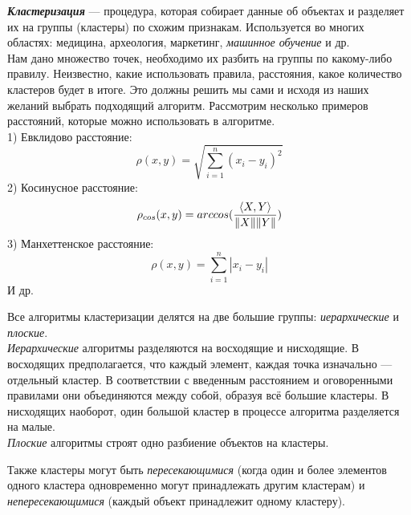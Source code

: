 \documentclass[12pt, a4paper]{article}
\begin{document}
\textit{\textbf{Кластеризация}}  —  процедура, которая собирает данные об объектах и разделяет их на группы (кластеры) по схожим признакам. Используется во многих областях: медицина, археология, маркетинг, \textit{машинное обучение} и др.\\
Нам дано множество точек, необходимо их разбить на группы по какому-либо правилу. Неизвестно, какие использовать правила, расстояния, какое количество кластеров будет в итоге. Это должны решить мы сами и исходя из наших желаний выбрать подходящий алгоритм. Рассмотрим несколько примеров расстояний, которые можно использовать в алгоритме.\\
1) Евклидово расстояние: 
\begin{equation}\label{eq:one}
\rho (x, y) = \sqrt{\sum_{i=1}^n (x_i - y_i)^2}
\end{equation}
2) Косинусное расстояние:
\begin{equation}\label{eq:two}
\rho_{cos} (x, y) = arccos({{\langle X,Y\rangle}\over{\| X \| \| Y \|}})
\end{equation}
3) Манхеттенское расстояние:
\begin{equation}\label{eq:three}
\rho (x, y) = \sum_{i=1}^n |x_i - y_i|
\end{equation}
И др.

Все алгоритмы кластеризации делятся на две большие группы: \textit{иерархические} и \textit{плоские}.\\
\textit{Иерархические} алгоритмы разделяются на восходящие и нисходящие. В восходящих предполагается, что каждый элемент, каждая точка изначально — отдельный кластер. В соответствии с введенным расстоянием и оговоренными правилами они объединяются  между собой, образуя всё большие кластеры. В нисходящих наоборот, один большой кластер в процессе алгоритма разделяется на малые. \\
\textit{Плоские} алгоритмы строят одно разбиение объектов на кластеры.

Также кластеры могут быть \textit{пересекающимися} (когда один и более элементов одного кластера одновременно могут принадлежать другим кластерам) и \textit{непересекающимися} (каждый объект принадлежит одному кластеру).
\medskip 
 \medskip 
  \medskip 
   \medskip 
   
\end{document}
